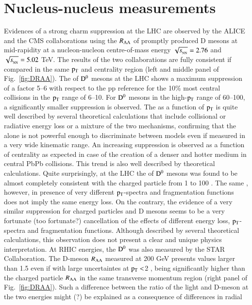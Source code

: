 \documentclass{webofc}
\begin{document}
\section{Nucleus-nucleus measurements}
\label{AAmeasurements}
Evidences of a strong charm suppression at the LHC are observed by the ALICE and the CMS collaborations using the $R_{\mathrm{AA}}$
of promptly produced D mesons at mid-rapidity at a nucleon-nucleon centre-of-mass energy $\sqrtsNN=2.76$ and $\sqrtsNN=5.02$ TeV. 
The results of the two collaborations are fully consistent if compared in the same $\rm p_{\rm T} $ and centrality region (left and middle panel of Fig.~\ref{fig:DRAA}). The \raa of $\rm D^{0}$ mesons at the LHC shows a maximum suppression of 
a factor 5--6 with respect to the pp reference for the 10\% most central collisions in the $\rm p_{\rm T} $ range of 6--10\GeVc. For $\rm D^{0}$ mesons in the high-$\rm p_{\rm T} $ range of 60--100\GeVc, a significantly smaller suppression is observed. 
The \raa as a function of $\rm p_{\rm T} $ is quite well described by several theoretical calculations that include collisional or radiative energy loss or a mixture of the two mechanisms, confirming that the 
\raa alone is not powerful enough to discriminate between models even if measured in a very wide kinematic range.
An increasing suppression is observed as a function of centrality as expected in case of the creation of a denser and hotter medium in central PbPb collisions. This trend is also 
well described by theoretical calculations. Quite surprisingly, at the LHC the \raa of $\rm D^{0}$ mesons was found to be almost 
completely consistent with the charged particle \raa from 1 to 100 \GeVc. The same \raa, however, in presence of very different $\rm p_{\rm T} $-spectra and fragmentation 
functions does not imply the same energy loss. On the contrary, the evidence of a very similar suppression for charged particles and D mesons seems to be a very fortunate (too fortunate?) cancellation of the effects
of different energy loss, $\rm p_{\rm T} $-spectra and fragmentation functions. Although described by several theoretical calculations, this observation does not present a clear and unique physics interpretation\footnotemark[\value{footnote}].
At RHIC energies, the $\rm D^{0}$ \raa was also measured by the STAR Collaboration. The D-meson $R_{\mathrm{AA}}$ measured at 200 GeV presents values larger than 1.5 even if with large uncertaintes at $\rm p_{\rm T} <$2 \GeVc, being significantly higher than 
the charged particle $R_{\mathrm{AA}}$ in the same transverse momentum region (right panel of Fig.~\ref{fig:DRAA}). Such a difference between the ratio of the light and D-meson \raa at the two energies might (?) be explained as a consequence of differences in radial 
\end{document}
